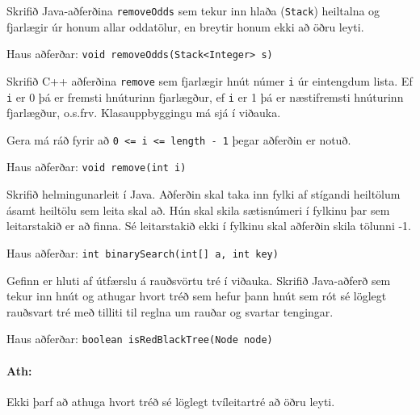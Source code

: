 \documentclass[addpoints]{exam}
\begin{document}
\begin{questions}
	\question[10]

	Skrifið Java-aðferðina \texttt{removeOdds} sem tekur inn hlaða (\texttt{Stack}) heiltalna og fjarlægir úr honum allar oddatölur, en breytir honum ekki að öðru leyti.

	Haus aðferðar: \texttt{void removeOdds(Stack<Integer> s)}


	\newpage

	\question[10]

	Skrifið C++ aðferðina \texttt{remove} sem fjarlægir hnút númer \texttt{i} úr eintengdum lista. Ef \texttt{i} er 0 þá er fremsti hnúturinn fjarlægður, ef \texttt{i} er 1 þá er næstifremsti hnúturinn fjarlægður, o.s.frv. Klasauppbyggingu má sjá í viðauka. 
	
	Gera má ráð fyrir að \texttt{0 <= i <= length - 1} þegar aðferðin er notuð.

	Haus aðferðar: \texttt{void remove(int i)}


	\newpage

	\question[10]

	Skrifið helmingunarleit í Java. Aðferðin skal taka inn fylki af stígandi heiltölum ásamt heiltölu sem leita skal að. Hún skal skila sætisnúmeri í fylkinu þar sem leitarstakið er að finna. Sé leitarstakið ekki í fylkinu skal aðferðin skila tölunni -1.

	Haus aðferðar: \texttt{int binarySearch(int[] a, int key)}


	\newpage

	\question[10]

	Gefinn er hluti af útfærslu á rauðsvörtu tré í viðauka. Skrifið Java-aðferð sem tekur inn hnút og athugar hvort tréð sem hefur þann hnút sem rót sé löglegt rauðsvart tré með tilliti til reglna um rauðar og svartar tengingar.

	Haus aðferðar: \texttt{boolean isRedBlackTree(Node node)}


	\paragraph{Ath:} Ekki þarf að athuga hvort tréð sé löglegt tvíleitartré að öðru leyti.

	\newpage

	\question


\end{questions}
\end{document}
